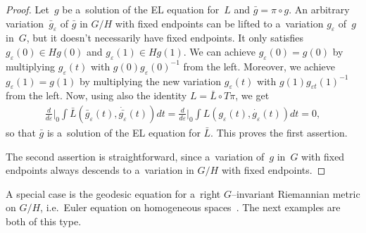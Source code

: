 \documentclass[10pt,a4paper]{amsart}
\numberwithin{equation}{section}
\begin{document}
\begin{proof}
Let~$g$ be a~solution of the EL equation for~$L$ and $\bar g=\pi\circ g$.
An arbitrary varia\-tion~$\bar g_\varepsilon$ of $\bar g$ in $G/H$ with f\/ixed endpoints can be lifted to a~variation
$g_\varepsilon$ of~$g$ in~$G$, but it doesn't necessarily have f\/ixed endpoints.
It only satisf\/ies $g_\varepsilon(0)\in Hg(0)$ and $g_\varepsilon(1)\in Hg(1)$.
We can achieve $g_\varepsilon(0)=g(0)$ by multiplying $g_\varepsilon(t)$ with $g(0)g_\varepsilon(0)^{-1}$ from the left.
Moreover, we achieve $g_\varepsilon(1)=g(1)$ by multiplying the new variation $g_\varepsilon(t)$ with
$g(1)g_{\varepsilon t}(1)^{-1}$ from the left.
Now, using also the identity $L=\bar L\circ T\pi$, we get
\begin{gather*}
\frac{d}{d\varepsilon}\Big|_0\int\bar L(\bar g_\varepsilon(t),\dot{\bar {g_\varepsilon}}(t))dt
=\frac{d}{d\varepsilon}\Big|_0\int L(g_\varepsilon(t),\dot{g_\varepsilon}(t))dt =0,
\end{gather*}
so that $\bar g$ is a~solution of the EL equation for $\bar L$.
This proves the f\/irst assertion.

The second assertion is straightforward, since a~variation of~$g$ in~$G$ with f\/ixed endpoints always descends to
a~variation in $G/H$ with f\/ixed endpoints.
\end{proof}

A special case is the geodesic equation for a~right $G$--invariant Riemannian metric on $G/H$, i.e.\ Euler equation on
homogeneous spaces~\cite{KM}.
The next examples are both of this type.
\end{document}
